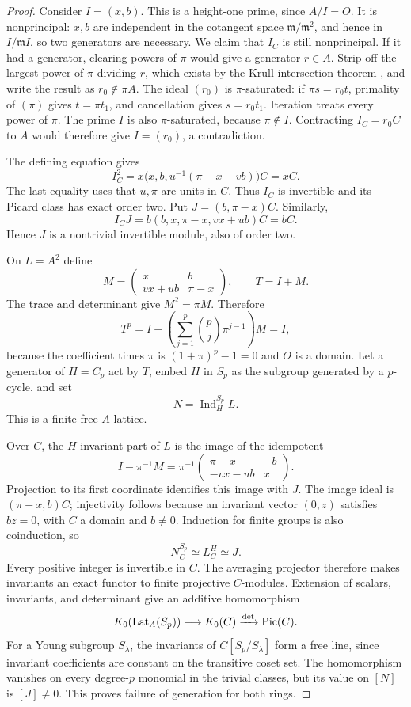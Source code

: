 \begin{proof}
Consider $I=(x,b)$.  This is a height-one prime, since $A/I=O$.
It is nonprincipal: $x,b$ are independent in the cotangent space
$\mathfrak m/\mathfrak m^2$, and hence in $I/\mathfrak m I$, so two
generators are necessary.  We claim that $I_C$ is still nonprincipal.
If it had a generator, clearing powers of $\pi$ would give a generator
$r\in A$.  Strip off the largest power of $\pi$ dividing $r$, which
exists by the Krull intersection theorem
\citep[Lemma 10.51.4, Tag 00IP]{Stacks2026}, and write the result as
$r_0\notin\pi A$.  The ideal $(r_0)$ is $\pi$-saturated: if
$\pi s=r_0t$, primality of $(\pi)$ gives $t=\pi t_1$, and cancellation
gives $s=r_0t_1$.  Iteration treats every power of $\pi$.
The prime $I$ is also $\pi$-saturated, because $\pi\notin I$.
Contracting $I_C=r_0C$ to $A$ would therefore give $I=(r_0)$,
a contradiction.

The defining equation gives
\[
 I_C^2=x\bigl(x,b,u^{-1}(\pi-x-vb)\bigr)C=xC.
\]
The last equality uses that $u,\pi$ are units in $C$.  Thus $I_C$
is invertible and its Picard class has exact order two.
Put $J=(b,\pi-x)C$.  Similarly,
\[
 I_CJ=b(b,x,\pi-x,vx+ub)C=bC.
\]
Hence $J$ is a nontrivial invertible module, also of order two.

On $L=A^2$ define
\[
 M=\begin{pmatrix}x&b\\vx+ub&\pi-x\end{pmatrix},
 \qquad T=I+M.
\]
The trace and determinant give $M^2=\pi M$.  Therefore
\[
 T^p
 =I+\left(\sum_{j=1}^{p}\binom pj\pi^{j-1}\right)M=I,
\]
because the coefficient times $\pi$ is $(1+\pi)^p-1=0$ and $O$ is
a domain.  Let a generator of $H=C_p$ act by $T$, embed $H$ in $S_p$
as the subgroup generated by a $p$-cycle, and set
\[
 N=\operatorname{Ind}_{H}^{S_p}L.
\]
This is a finite free $A$-lattice.

Over $C$, the $H$-invariant part of $L$ is the image of the idempotent
\[
 I-\pi^{-1}M
 =\pi^{-1}\begin{pmatrix}\pi-x&-b\\-vx-ub&x\end{pmatrix}.
\]
Projection to its first coordinate identifies this image with $J$.
The image ideal is $(\pi-x,b)C$; injectivity follows because an
invariant vector $(0,z)$ satisfies $bz=0$, with $C$ a domain and
$b\ne0$.  Induction for finite groups is also coinduction, so
\[
 N_C^{S_p}\simeq L_C^H\simeq J.
\]
Every positive integer is invertible in $C$.  The averaging projector
therefore makes invariants an exact functor to finite projective
$C$-modules.  Extension of scalars, invariants, and determinant give
an additive homomorphism
\[
 K_0(\operatorname{Lat}_A(S_p))\longrightarrow K_0(C)
                       \xrightarrow{\det}\operatorname{Pic}(C).
\]
For a Young subgroup $S_\lambda$, the invariants of
$C[S_p/S_\lambda]$ form a free line, since invariant coefficients are
constant on the transitive coset set.  The homomorphism vanishes on
every degree-$p$ monomial in the trivial classes, but its value on
$[N]$ is $[J]\ne0$.  This proves failure of generation for both rings.
\end{proof}

